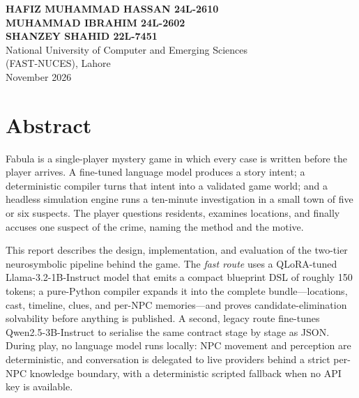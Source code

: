 ﻿\documentclass[11pt,a4paper]{report}
\newcommand{\reportdate}{November 2026}
\begin{document}
\begin{titlepage}
\vfill
\begin{center}
  {\sffamily\small\color{FCream!90}\bfseries
    HAFIZ MUHAMMAD HASSAN \quad\textperiodcentered\quad 24L-2610\\[2pt]
    MUHAMMAD IBRAHIM \quad\textperiodcentered\quad 24L-2602\\[2pt]
    SHANZEY SHAHID \quad\textperiodcentered\quad 22L-7451}\\[0.85cm]
  {\sffamily\footnotesize\color{FCream!70}
    National University of Computer and Emerging Sciences\\ (FAST-NUCES), Lahore}\\[0.45cm]
  {\sffamily\footnotesize\color{FGold}\reportdate}
\end{center}
\vspace*{0.9cm}
\end{titlepage}
\hypersetup{pageanchor=true}

\clearpage
{}
{}
\chapter*{Abstract}

Fabula is a single-player mystery game in which every case is written before the player arrives. A fine-tuned language model produces a story intent; a deterministic compiler turns that intent into a validated game world; and a headless simulation engine runs a ten-minute investigation in a small town of five or six suspects. The player questions residents, examines locations, and finally accuses one suspect of the crime, naming the method and the motive.

This report describes the design, implementation, and evaluation of the two-tier neurosymbolic pipeline behind the game. The \emph{fast route} uses a QLoRA-tuned Llama-3.2-1B-Instruct model that emits a compact blueprint DSL of roughly 150 tokens; a pure-Python compiler expands it into the complete bundle---locations, cast, timeline, clues, and per-NPC memories---and proves candidate-elimination solvability before anything is published. A second, legacy route fine-tunes Qwen2.5-3B-Instruct to serialise the same contract stage by stage as JSON. During play, no language model runs locally: NPC movement and perception are deterministic, and conversation is delegated to live providers behind a strict per-NPC knowledge boundary, with a deterministic scripted fallback when no API key is available.
\end{document}
